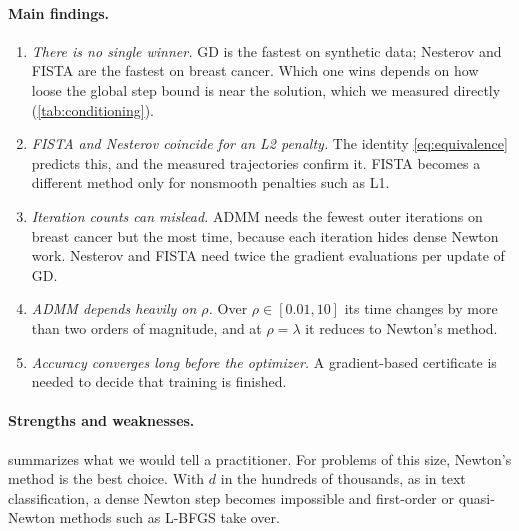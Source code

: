\documentclass{article}
\begin{document}
\paragraph{Main findings.}
\begin{enumerate}
\item \emph{There is no single winner.} GD is the fastest on synthetic data; Nesterov and FISTA are the fastest on breast cancer. Which one wins depends on how loose the global step bound is near the solution, which we measured directly (\cref{tab:conditioning}).
\item \emph{FISTA and Nesterov coincide for an L2 penalty.} The identity \eqref{eq:equivalence} predicts this, and the measured trajectories confirm it. FISTA becomes a different method only for nonsmooth penalties such as L1.
\item \emph{Iteration counts can mislead.} ADMM needs the fewest outer iterations on breast cancer but the most time, because each iteration hides dense Newton work. Nesterov and FISTA need twice the gradient evaluations per update of GD.
\item \emph{ADMM depends heavily on $\rho$.} Over $\rho\in[0.01,10]$ its time changes by more than two orders of magnitude, and at $\rho=\lambda$ it reduces to Newton's method.
\item \emph{Accuracy converges long before the optimizer.} A gradient-based certificate is needed to decide that training is finished.
\end{enumerate}

\paragraph{Strengths and weaknesses.}
 summarizes what we would tell a practitioner. For problems of this size, Newton's method is the best choice. With $d$ in the hundreds of thousands, as in text classification, a dense Newton step becomes impossible and first-order or quasi-Newton methods such as L-BFGS \citep{liu1989limited} take over.
\end{document}

